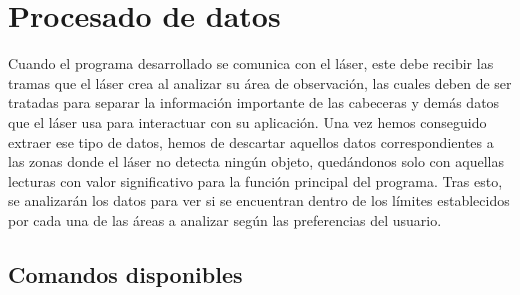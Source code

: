 \section{Procesado de datos}

Cuando el programa desarrollado se comunica con el láser, este debe recibir las tramas que el láser crea al analizar su área de observación, las cuales deben de ser tratadas para separar la información importante de las cabeceras y demás datos que el láser usa para interactuar con su aplicación. Una vez hemos conseguido extraer ese tipo de datos, hemos de descartar aquellos datos correspondientes a las zonas donde el láser no detecta ningún objeto, quedándonos solo con aquellas lecturas con valor significativo para la función principal del programa. Tras esto, se analizarán los datos para ver si se encuentran dentro de los límites establecidos por cada una de las áreas a analizar según las preferencias del usuario.\\

\subsection{Comandos disponibles}

